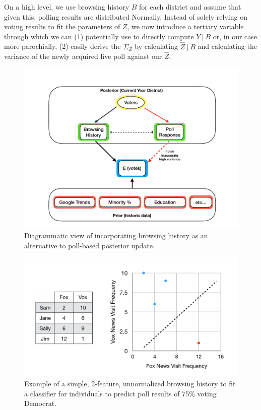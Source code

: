 \documentclass[12pt, letterpaper]{article}
\begin{document}
On a high level, we use browsing history $B$ for each district and assume that given this, polling results are distributed Normally. Instead of solely relying on voting results to fit the parameters of $Z$, we now introduce a tertiary variable through which we can (1) potentially use to directly compute $Y \ | \ B$ or, in our case more parochially, (2) easily derive the $\Sigma_Z$ by calculating $\hat{Z} \ | \ B$ and calculating the variance of the newly acquired live poll against our $\hat{Z}$.

\begin{figure}[tbh]
  \centering
  \includegraphics[scale=0.3]{browsing_diagram.pdf}
  \caption{Diagrammatic view of incorporating browsing history as an alternative to poll-based posterior update.}
  \label{fig:browsing}
\end{figure}

\begin{figure}[tbh]
  \centering
  \includegraphics[scale=0.4]{browse_table}
  \caption{Example of a simple, 2-feature, unnormalized browsing history to fit a classifier for individuals to predict poll results of 75\% voting Democrat.}
  \label{fig:browse_table}
\end{figure}
\end{document}
